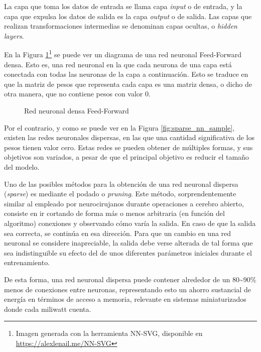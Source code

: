 La capa que toma los datos de entrada se llama capa \textit{input} o de entrada, y la capa que expulsa los datos de salida es la capa \textit{output} o de salida. Las capas que realizan transformaciones intermedias se denominan capas ocultas, o \textit{hidden layers}.

En la Figura \ref{fig:dense_nn_sample}\footnote{Imagen generada con la herramienta NN-SVG, disponible en \url{https://alexlenail.me/NN-SVG}} se puede ver un diagrama de una red neuronal Feed-Forward densa. Esto es, una red neuronal en la que cada neurona de una capa está conectada con todas las neuronas de la capa a continuación. Esto se traduce en que la matriz de pesos que representa cada capa es una matriz densa, o dicho de otra manera, que no contiene pesos con valor 0.

\begin{figure}[h!]
    \centering
    \vspace*{0.5cm}
    \def\svgwidth{0.85\textwidth}
    
    \caption{Red neuronal densa Feed-Forward}
    \label{fig:dense_nn_sample}
\end{figure}

Por el contrario, y como se puede ver en la Figura \ref{fig:sparse_nn_sample}, existen las redes neuronales dispersas, en las que una cantidad significativa de los pesos tienen valor cero. Estas redes se pueden obtener de múltiples formas, y sus objetivos son variados, a pesar de que el principal objetivo es reducir el tamaño del modelo.

Uno de las posibles métodos para la obtención de una red neuronal dispersa (\textit{sparse}) es mediante el podado o \textit{pruning}. Este método, sorprendentemente similar al empleado por neurocirujanos durante operaciones a cerebro abierto, consiste en ir cortando de forma más o menos arbitraria (en función del algoritmo) conexiones y observando cómo varía la salida. En caso de que la salida sea correcta, se continúa en esa dirección. Para que un cambio en una red neuronal se considere inapreciable, la salida debe verse alterada de tal forma que sea indistinguible su efecto del de unos diferentes parámetros iniciales durante el entrenamiento.

De esta forma, una red neuronal dispersa puede contener alrededor de un 80\textasciitilde90\% menos de conexiones entre neuronas, representando esto un ahorro sustancial de energía en términos de acceso a memoria, relevante en sistemas miniaturizados donde cada miliwatt cuenta.

